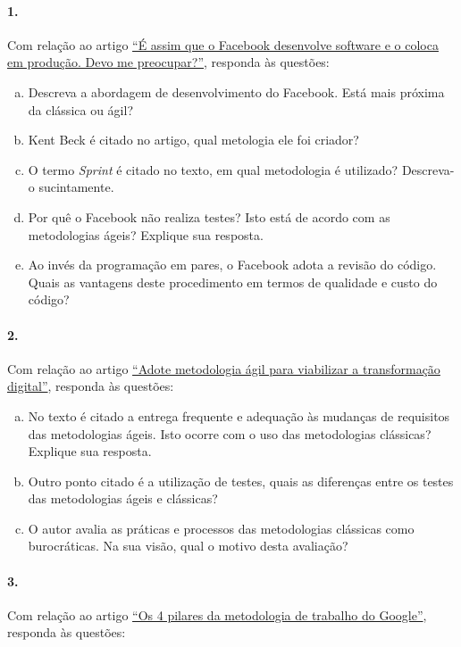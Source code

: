 \paragraph{1.} Com relação ao artigo \href{https://imasters.com.br/desenvolvimento/e-assim-que-o-facebook-desenvolve-software-e-o-coloca-em-producao-devo-me-preocupar/}{``É assim que o Facebook
desenvolve software e o coloca em produção. Devo me preocupar?''},
responda às questões:

\begin{enumerate}[a)]
\item Descreva a abordagem de desenvolvimento do Facebook. Está mais
  próxima da clássica ou ágil?
\item Kent Beck é citado no artigo, qual metologia ele foi criador?
\item O termo {\em Sprint} é citado no texto, em qual metodologia é utilizado?
  Descreva-o sucintamente.
\item Por quê o Facebook não realiza testes? Isto está de acordo com as
  metodologias ágeis? Explique sua resposta.
\item Ao invés da programação em pares, o Facebook adota a revisão do
  código. Quais as vantagens deste procedimento em termos de qualidade e
  custo do código?
\end{enumerate}

\paragraph{2.} Com relação ao artigo \href{http://computerworld.com.br/adote-metodologia-agil-para-viabilizar-transformacao-digital}{``Adote metodologia ágil para viabilizar a transformação digital''}, responda às questões:

\begin{enumerate}[a)]
\item No texto é citado a entrega frequente e adequação às mudanças de
  requisitos das metodologias ágeis. Isto ocorre com o uso das
  metodologias clássicas? Explique sua resposta.
\item Outro ponto citado é a utilização de testes, quais as diferenças
  entre os testes das metodologias ágeis e clássicas?
\item O autor avalia as práticas e processos das metodologias
  clássicas como burocráticas. Na sua visão, qual o motivo desta
  avaliação?
\end{enumerate}
 
\paragraph{3.} Com relação ao artigo \href{https://conteudo.startse.com.br/educacao/redacao/os-4-pilares-da-metodologia-de-trabalho-do-google/}{``Os 4 pilares da metodologia de
trabalho do Google''}, responda às questões:

